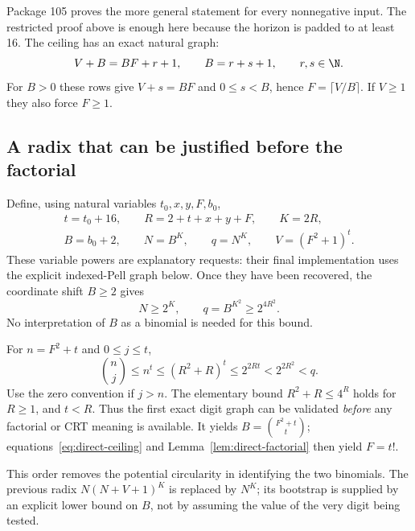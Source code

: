 Package 105 proves the more general statement for every nonnegative input.
The restricted proof above is enough here because the horizon is padded
to at least 16. The ceiling has an exact natural graph:
\begin{equation}\label{eq:direct-ceiling}
 V+B=BF+r+1,\qquad B=r+s+1,\qquad r,s\in\N.
\end{equation}
For $B>0$ these rows give $V+s=BF$ and $0\le s<B$, hence
$F=\lceil V/B\rceil$. If $V\ge1$ they also force $F\ge1$.

\subsection{A radix that can be justified before the factorial}

Define, using natural variables $t_0,x,y,F,b_0$,
\begin{equation}\label{eq:direct-radix}
 \begin{gathered}
 t=t_0+16,\qquad R=2+t+x+y+F,\qquad K=2R,\\
 B=b_0+2,\qquad N=B^K,\qquad q=N^K,\qquad V=(F^2+1)^t.
 \end{gathered}
\end{equation}
These variable powers are explanatory requests: their final implementation
uses the explicit indexed-Pell graph below. Once they have been recovered,
the coordinate shift $B\ge2$ gives
\begin{equation}\label{eq:direct-independent-radix}
 N\ge2^K,\qquad q=B^{K^2}\ge2^{4R^2}.
\end{equation}
No interpretation of $B$ as a binomial is needed for this bound.

For $n=F^2+t$ and $0\le j\le t$,
\begin{equation}\label{eq:direct-first-digit-bound}
 \binom nj\le n^t\le(R^2+R)^t
       \le2^{2Rt}<2^{2R^2}<q.
\end{equation}
Use the zero convention if $j>n$. The elementary bound $R^2+R\le4^R$
holds for $R\ge1$, and $t<R$. Thus the first exact digit graph can be
validated \emph{before} any factorial or CRT meaning is available. It yields
$B=\binom{F^2+t}{t}$; equations~\eqref{eq:direct-ceiling} and
Lemma~\ref{lem:direct-factorial} then yield $F=t!$.

This order removes the potential circularity in identifying the two
binomials. The previous radix $N(N+V+1)^K$ is replaced by $N^K$; its
bootstrap is supplied by an explicit lower bound on $B$, not by assuming
the value of the very digit being tested.

